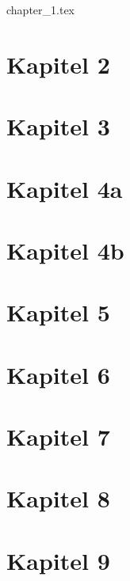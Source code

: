 \documentclass[10pt]{extarticle}
\begin{document}
\begin{multicols}{2}

{chapter_1.tex}

\section*{Kapitel 2}

\section*{Kapitel 3}

\section*{Kapitel 4a}

\section*{Kapitel 4b}

\section*{Kapitel 5}

\section*{Kapitel 6}

\section*{Kapitel 7}

\section*{Kapitel 8}

\section*{Kapitel 9}

\end{multicols}
\end{document}
